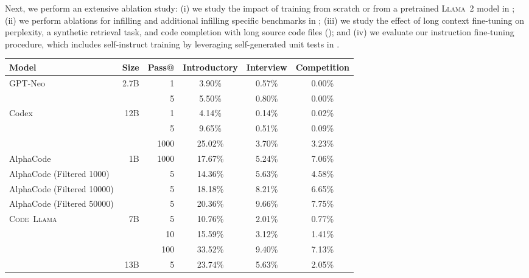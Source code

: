 \documentclass[10pt]{article}
\newcommand{\model}{\textsc{Code~Llama}\xspace}
\newcommand{\llamavtwo}{\textsc{Llama~2}\xspace}
\newcommand*{\acc}[1]{\num[round-mode=places,round-precision=1]{#1}\%}
\begin{document}
Next, we perform an extensive ablation study: (i) we study the impact of training from scratch or from a pretrained \llamavtwo model in ; (ii) we perform ablations for infilling and additional infilling specific benchmarks in ; (iii) we study the effect of long context fine-tuning on perplexity, a synthetic retrieval task, and code completion with long source code files (); and (iv) we evaluate our instruction fine-tuning procedure, which includes self-instruct training by leveraging self-generated unit tests in .


\begin{table}[t!]
  \center
  \setlength{\tabcolsep}{3pt}
  \begin{tabular}{lrr|ccc} \toprule
  Model                      & Size                 & Pass@ & Introductory & Interview & Competition \\
    \midrule
\multirow{2}{*}{GPT-Neo} 
    & \multirow{2}{*}{2.7B} & 1 & \acc{3.90} & \acc{0.57} & \acc{0.00} \\
    &                       & 5 & \acc{5.50} & \acc{0.80} & \acc{0.00} \\
    \midrule
\multirow{3}{*}{Codex} 
    & \multirow{3}{*}{12B}  & 1 & \acc{4.14} & \acc{0.14} & \acc{0.02} \\
    &                    & 5 & \acc{9.65} & \acc{0.51} & \acc{0.09} \\
    &                    & 1000 & \acc{25.02} & \acc{3.70} & \acc{3.23} \\
    \midrule
\multirow{1}{*}{AlphaCode} & \multirow{4}{*}{1B} & 1000 & \acc{17.67} & \acc{5.24} & \acc{7.06} \\
\multirow{1}{*}{AlphaCode (Filtered 1000)} & & 5 & \acc{14.36} & \acc{5.63} & \acc{4.58} \\
\multirow{1}{*}{AlphaCode (Filtered 10000)} &  & 5 & \acc{18.18} & \acc{8.21} & \acc{6.65} \\
\multirow{1}{*}{AlphaCode (Filtered 50000)} &  & 5 & \acc{20.36} & \acc{9.66} & \acc{7.75} \\
    \midrule
\multirow{9}{*}{\model} 
    & \multirow{3}{*}{7B}  & 5     & \acc{10.76} & \acc{2.01} & \acc{0.77} \\
    &                      & 10    & \acc{15.59} & \acc{3.12} & \acc{1.41} \\
    &                      & 100   & \acc{33.52} & \acc{9.40} & \acc{7.13} \\
    \cmidrule{2-6}
    & \multirow{3}{*}{13B} & 5     & \acc{23.74} & \acc{5.63} & \acc{2.05} \\

\end{tabular}
\end{table}
\end{document}
